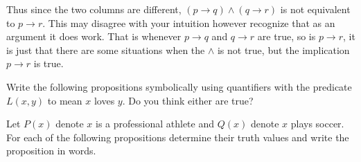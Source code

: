 \documentclass[addpoints]{exam}
\begin{document}
\begin{questions}
\begin{parts}
\begin{solution}
      Thus since the two columns are different, $(p\rightarrow q) \wedge 
      (q\rightarrow r)$ is not equivalent to $p\rightarrow r$. This may disagree
      with your intuition however recognize that as an argument it does work.
      That is whenever $p\rightarrow q$ and $q\rightarrow r$ are true, so is
      $p\rightarrow r$, it is just that there are some situations when the
      $\wedge$ is not true, but the implication $p\rightarrow r$ is true. 
    \end{solution}

  \end{parts}

  \question[6] Write the following propositions symbolically using quantifiers
  with the predicate $L(x,y)$ to mean $x$ loves $y$. Do you think either are
  true?
  
  \question[6] Let $P(x)$ denote $x$ is a professional athlete and $Q(x)$ denote
  $x$ plays soccer. For each of the following propositions determine their truth
  values and write the proposition in words.
\end{questions}
\end{document}
